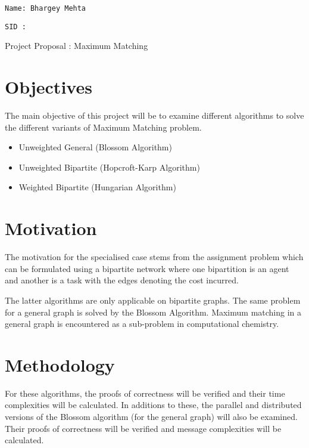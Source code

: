 \documentclass{article}
\begin{document}
\Large{\texttt{Name: Bhargey Mehta}}

\Large{\texttt{SID : }}



\begin{center}
\huge{Project Proposal : Maximum Matching}
\end{center}

\section{Objectives}
The main objective of this project will be to examine different algorithms to solve the different variants of Maximum Matching problem.

\begin{itemize}
    \item Unweighted General (Blossom Algorithm)
    \item Unweighted Bipartite (Hopcroft-Karp Algorithm)
    \item Weighted Bipartite (Hungarian Algorithm)
\end{itemize}

\section{Motivation}
The motivation for the specialised case stems from the assignment problem which can be formulated using a bipartite network where one bipartition is an agent and another is a task with the edges denoting the cost incurred. 

The latter algorithms are only applicable on bipartite graphs. The same problem for a general graph is solved by the Blossom Algorithm. Maximum matching in a general graph is encountered as a sub-problem in computational chemistry.

\section{Methodology}
For these algorithms, the proofs of correctness will be verified and their time complexities will be calculated. In additions to these, the parallel and distributed versions of the Blossom algorithm (for the general graph) will also be examined. Their proofs of correctness will be verified and message complexities will be calculated.
\end{document}
